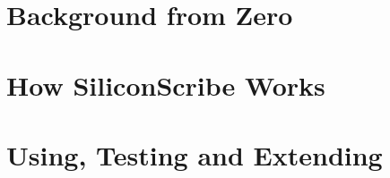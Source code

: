 \documentclass[11pt,a4paper,oneside]{report}
\begin{document}
\clearpage
{}

\part{Background from Zero}


\part{How SiliconScribe Works}


\part{Using, Testing and Extending}


\appendix
{}

\end{document}
